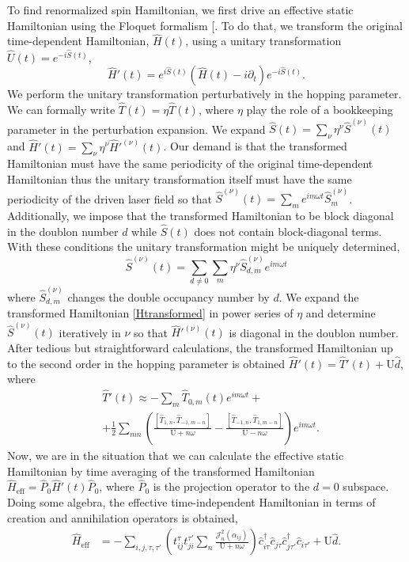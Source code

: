 \documentclass[aps,prl,twocolumn,amsmath,amssymb,nobibnotes]{revtex4-1}%
\renewcommand{\cite}[1]{{[}\onlinecite{#1}{]}}
\newcommand{\n}{\nonumber}
\begin{document}
To find renormalized spin Hamiltonian, we first drive an effective static Hamiltonian using the Floquet formalism \cite{Floquet1,Floquet2}. To do that, we transform the original time-dependent Hamiltonian, $\hat{H}(t)$, using a unitary transformation $\hat{U}(t) = e^{-i\hat{S}(t)}$,
\begin{equation}
\hat{H}'(t) = e^{i\hat{S}(t)} \left(\hat{H}(t)  -  i\partial_t \right) e^{-i\hat{S}(t)}.
\label{Htransformed}
\end{equation}
We perform the unitary transformation perturbatively in the hopping parameter. We can formally write $\hat{T}(t) = \eta \hat{T}(t)$, where $\eta$ play the role of a bookkeeping parameter in the perturbation expansion. We expand $\hat{S}(t) = \sum_\nu \eta^\nu \hat{S}^{(\nu)}(t)$ and $\hat{H}'(t) = \sum_\nu \eta^\nu \hat{H}'^{(\nu)}(t)$. Our demand is that the transformed Hamiltonian must have the same periodicity of the original time-dependent Hamiltonian thus the unitary transformation itself must have the same periodicity of the driven laser field so that $\hat{S}^{(\nu)}(t) = \sum_m e^{im\omega t}\hat{S}^{(\nu)}_m$. Additionally, we impose that the transformed Hamiltonian to be block diagonal in the doublon number $d$ while $\hat{S}(t)$ does not contain block-diagonal terms. With these conditions the unitary transformation might be uniquely determined,
\begin{equation}
\hat{S}^{(\nu)}(t) = \sum_{d \neq 0} \sum_m \eta^\nu \hat{S}^{(\nu)}_{d,m} e^{im\omega t}
\end{equation}
where $\hat{S}^{(\nu)}_{d,m}$ changes the double occupancy number by $d$. We expand the transformed Hamiltonian \ref{Htransformed} in power series of $\eta$ and determine $\hat{S}^{(\nu)}(t)$ iteratively in $\nu$ so that $\hat{H}'^{(\nu)}(t)$ is diagonal in the doublon number. After tedious but straightforward calculations, the transformed Hamiltonian up to the second order in the hopping parameter is obtained $\hat{H}'(t)= \hat{T}'(t)+\text{U}\hat{d}$, where
\begin{align}
\label{transformedH}
&\hat{T}'(t) \approx  - \sum_m \hat{T}_{0,m}(t)e^{im\omega t} + \n \\
&+ \frac{1}{2}\sum_{mn} \left( \frac{\left[\hat{T}_{1,n}, \hat{T}_{-1,m-n} \right]}{\text{U}+n\omega} - \frac{\left[\hat{T}_{-1,n}, \hat{T}_{1,m-n} \right]}{\text{U}-n\omega} \right) e^{im\omega t}.
\end{align}
Now, we are in the situation that we can calculate the effective static Hamiltonian by time averaging of the transformed Hamiltonian $\hat{H}_{\text{eff}}=\hat{P}_0\hat{H}'(t)\hat{P}_0$, where $\hat{P}_0$ is the projection operator to the $d=0$ subspace.
Doing some algebra, the effective time-independent Hamiltonian in terms of creation and annihilation operators is obtained,
\begin{align}
\hat{H}_{\text{eff}} &= - \sum_{i,j, \tau, \tau'} \left(t_{ij}^{\tau} t_{ji}^{\tau'} \sum_{n} \frac{\mathcal{J}_{n}^2(\alpha_{ij})}{\text{U}+n\omega} \right)  \hat{c}_{i \tau}^\dagger \hat{c}_{j \tau} \hat{c}_{j \tau'}^\dagger \hat{c}_{i \tau'}+\text{U}\hat{d}. \label{GeneralHeff}
\end{align}
\end{document}
